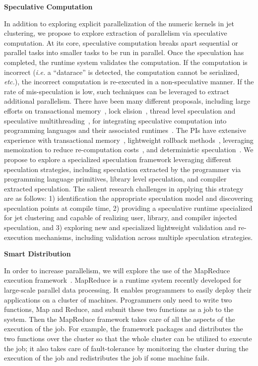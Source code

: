 \documentclass[times,11pt]{article}
\begin{document}
\bigskip
\noindent
{\bf Speculative Computation}
\bigskip

In addition to exploring explicit parallelization of the numeric kernels in jet clustering, we
propose to explore extraction of parallelism via speculative computation. At its core, speculative
computation breaks apart sequential or parallel tasks into smaller tasks to be run in parallel. Once
the speculation has completed, the runtime system validates the computation. If the computation is
incorrect ({\em i.e.} a ``datarace'' is detected, the computation cannot be serialized, {\em etc.}), the
incorrect computation is re-executed in a non-speculative manner.  If the rate of mis-speculation
is low, such techniques can be leveraged to extract additional
parallelism. 
There have been many different
proposals, including large efforts on transactional memory~\cite{},
lock elision~\cite{}, thread level speculation and speculative
multithreading~\cite{},
 for integrating speculative computation into programming languages
 and their associated runtimes~\cite{}.
The PIs have extensive experience with transactional memory~\cite{trans}, lightweight rollback methods~\cite{stab}, 
leveraging memoization to reduce re-computation costs~\cite{memo1, memo2},
and deterministic speculation~\cite{iso}. We propose to explore a specialized speculation framework leveraging different
speculation strategies, including speculation extracted by the programmer via programming language primitives,
library level speculation, and compiler extracted speculation.
The salient research
challenges in applying this strategy are as follows:  1) identification the appropriate speculation model and
discovering speculation points at compile time, 2) providing a speculative runtime specialized for jet clustering
and capable of realizing user, library, and compiler injected speculation, and 3) exploring new and specialized
lightweight validation and re-execution mechanisms, including validation across multiple speculation strategies.



\bigskip
\noindent
{\bf Smart Distribution}
\bigskip

In order to increase parallelism, we will explore the use of the MapReduce
execution framework~\cite{mapreduce-osdi, mapreduce-hadoop}. MapReduce is a
runtime system recently developed for large-scale parallel data processing. It
enables programmers to easily deploy their applications on a cluster of
machines. Programmers only need to write two functions, Map and Reduce, and
submit these two functions as a job to the system. Then the MapReduce framework
takes care of all the aspects of the execution of the job. For example, the
framework packages and distributes the two functions over the cluster so that
the whole cluster can be utilized to execute the job; it also takes care of
fault-tolerance by monitoring the cluster during the execution of the job and
redistributes the job if some machine fails.
\end{document}
